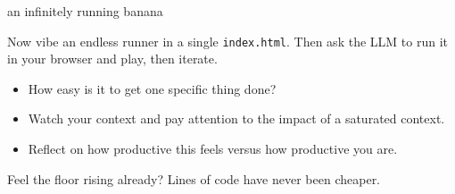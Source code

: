 





\begin{frame}{ an infinitely running banana}
  \begin{sidebody}
    Now vibe an endless runner in a single \texttt{index.html}. 
    Then ask the LLM to run it in your browser 
    and play, then iterate.
    \begin{itemize}
      \item How easy is it to get one specific thing done?
      \item Watch your context and pay attention to the impact of a saturated context.
      \item Reflect on how productive this feels versus how productive you are.
    \end{itemize}
    \vspace{0.5em}
    \begin{tdblock}
      Feel the \alert{floor rising} already? Lines of code have never been cheaper.
    \end{tdblock}
  \end{sidebody}
\end{frame}

